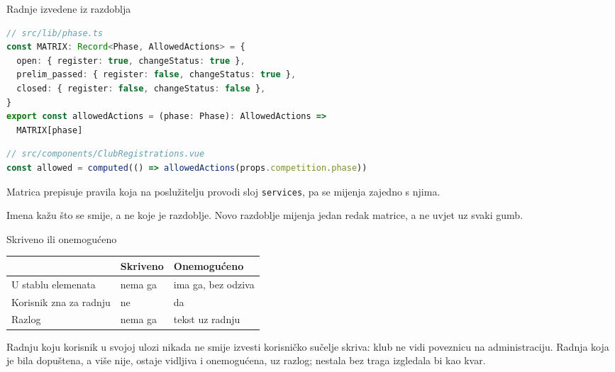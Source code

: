 \begin{frame}[fragile]{Radnje izvedene iz razdoblja}
\begin{lstlisting}[language=typescript]
// src/lib/phase.ts
const MATRIX: Record<Phase, AllowedActions> = {
  open: { register: true, changeStatus: true },
  prelim_passed: { register: false, changeStatus: true },
  closed: { register: false, changeStatus: false },
}
export const allowedActions = (phase: Phase): AllowedActions =>
  MATRIX[phase]
\end{lstlisting}

\begin{lstlisting}[language=typescript]
// src/components/ClubRegistrations.vue
const allowed = computed(() => allowedActions(props.competition.phase))
\end{lstlisting}

\vspace{0.2em}
Matrica prepisuje pravila koja na poslužitelju provodi sloj \texttt{services}, pa se mijenja zajedno s njima.

\vspace{0.2em}
Imena kažu što se smije, a ne koje je razdoblje. Novo razdoblje mijenja jedan redak matrice, a ne uvjet uz svaki gumb.
\end{frame}

\begin{frame}{Skriveno ili onemogućeno}
\vspace{0.3em}
\begin{center}
{\small
\setlength{\tabcolsep}{6pt}
\renewcommand{\arraystretch}{1.3}
\begin{tabular}{@{}L{3.6cm}L{3.6cm}L{3.8cm}@{}}
  \toprule
   & \textbf{Skriveno} & \textbf{Onemogućeno} \\
  \midrule
  U stablu elemenata & nema ga & ima ga, bez odziva \\
  Korisnik zna za radnju & ne & da \\
  Razlog & nema ga & tekst uz radnju \\
  \bottomrule
\end{tabular}
}
\end{center}

\vspace{0.6em}
\begin{konvencija}
Radnju koju korisnik u svojoj ulozi nikada ne smije izvesti korisničko sučelje skriva: klub ne vidi poveznicu na administraciju. Radnja koja je bila dopuštena, a više nije, ostaje vidljiva i onemogućena, uz razlog; nestala bez traga izgledala bi kao kvar.
\end{konvencija}
\end{frame}

